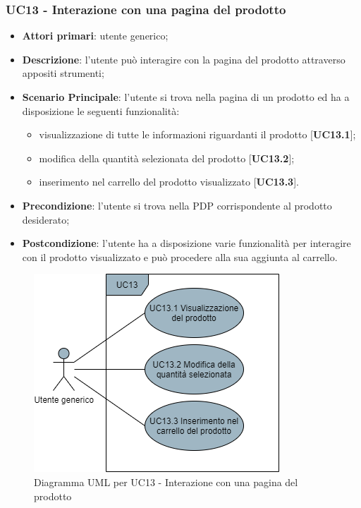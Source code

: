 \subsubsection{UC13 - Interazione con una pagina del prodotto}
\begin{itemize}
\item \textbf{Attori primari}: utente generico;
\item \textbf{Descrizione}: l'utente può interagire con la pagina del prodotto attraverso appositi strumenti;
\item \textbf{Scenario Principale}: l'utente si trova nella pagina di un prodotto ed ha a disposizione le seguenti funzionalità:
\begin{itemize}
\item visualizzazione di tutte le informazioni riguardanti il prodotto [\textbf{UC13.1}];
\item modifica della quantità selezionata del prodotto [\textbf{UC13.2}];
\item inserimento nel carrello del prodotto visualizzato [\textbf{UC13.3}].
\end{itemize}
\item \textbf{Precondizione}: l'utente si trova nella PDP corrispondente al prodotto desiderato;
\item \textbf{Postcondizione}: l'utente ha a disposizione varie funzionalità per interagire con il prodotto visualizzato e può procedere alla sua aggiunta al carrello.
\end{itemize}

\begin{figure}[H]
\centering
\includegraphics[scale=0.6]{res/UseCase/Immagini/InterazionePaginaProdotto}
\caption{Diagramma UML per UC13 - Interazione con una pagina del prodotto}
\end{figure}

